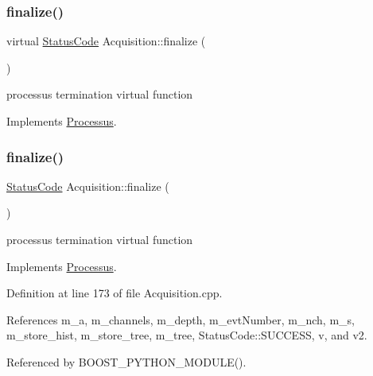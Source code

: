 \subsubsection{\texorpdfstring{finalize()}{finalize()}\hspace{0.1cm}{\footnotesize\ttfamily [1/2]}}
{\footnotesize\ttfamily virtual \hyperlink{classStatusCode}{Status\+Code} Acquisition\+::finalize (\begin{DoxyParamCaption}{ }\end{DoxyParamCaption})\hspace{0.3cm}{\ttfamily [virtual]}}

processus termination virtual function 

Implements \hyperlink{classProcessus_aba93d691f031bdb18ae4b8afb1b2e856}{Processus}.

\mbox{\label{classAcquisition_ab8ffcd86548280f0403b3ae6338f2499}} 
\subsubsection{\texorpdfstring{finalize()}{finalize()}\hspace{0.1cm}{\footnotesize\ttfamily [2/2]}}
{\footnotesize\ttfamily \hyperlink{classStatusCode}{Status\+Code} Acquisition\+::finalize (\begin{DoxyParamCaption}{ }\end{DoxyParamCaption})\hspace{0.3cm}{\ttfamily [virtual]}}

processus termination virtual function 

Implements \hyperlink{classProcessus_aba93d691f031bdb18ae4b8afb1b2e856}{Processus}.



Definition at line 173 of file Acquisition.\+cpp.



References m\+\_\+a, m\+\_\+channels, m\+\_\+depth, m\+\_\+evt\+Number, m\+\_\+nch, m\+\_\+s, m\+\_\+store\+\_\+hist, m\+\_\+store\+\_\+tree, m\+\_\+tree, Status\+Code\+::\+S\+U\+C\+C\+E\+SS, v, and v2.



Referenced by B\+O\+O\+S\+T\+\_\+\+P\+Y\+T\+H\+O\+N\+\_\+\+M\+O\+D\+U\+L\+E().


